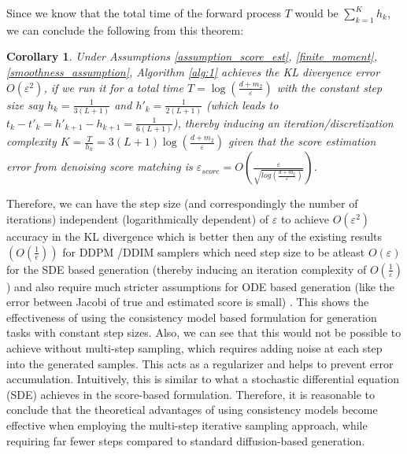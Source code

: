 \documentclass[11pt]{article}
\newcommand{\xh}[1]{\textcolor[HTML]{66CCFF}{#1}}
\newtheorem{corollary}[lemma]{Corollary}
\begin{document}


\noindent
Since we know that the total time of the forward process $T$ would be $\sum^K_{k=1}h_k$, we can conclude the following from this theorem:
\begin{corollary}
 Under Assumptions \ref{assumption_score_est}, \ref{finite_moment}, \ref{smoothness_assumption},   Algorithm \ref{alg:1} achieves the KL divergence error $O(\varepsilon^2)$, if we run it for a total time $T = \log(\frac{d+m_2}{\varepsilon})$
    with the constant step size say $h_k = \frac{1}{3(L+1)}$ and $h'_k = \frac{1}{2(L+1)}$ (which leads to $t_k-t'_k = h'_{k+1}-h_{k+1} = \frac{1}{6(L+1)}$), thereby inducing an iteration/discretization complexity $K=\frac{T}{h_k} = 3(L+1)\log(\frac{d+m_2}{\varepsilon})$ given that the score estimation error from denoising score matching is $\varepsilon_{score} = O\left(\frac{\varepsilon}{\sqrt{log(\frac{d+m_2}{\varepsilon})}}\right)$. 
    
\end{corollary}

\noindent
Therefore, we can have the step size (and correspondingly the number of iterations) independent (logarithmically dependent) of $\varepsilon$ to achieve $O(\varepsilon^2)$ accuracy in the KL divergence which is better then any of the existing results $\left(O(\frac{1}{\epsilon})\right)$ for DDPM \cite{ho2020denoising}/DDIM \cite{song2020denoising} samplers which need step size to be atleast $O(\varepsilon)$ for the SDE based generation \cite{li2024d} (thereby inducing an iteration complexity of $O(\frac{1}{\varepsilon})$) and also require much stricter assumptions for ODE based generation (like the error between Jacobi of true and estimated score is small) \cite{li2024sharp,li2024unified}.
This shows the effectiveness of using the consistency model based formulation for generation tasks with constant step sizes. 
Also, we can see that this would not be possible to achieve without multi-step sampling, which requires adding noise at each step into the generated samples. This acts as a regularizer and helps to prevent error accumulation. Intuitively, this is similar to what a stochastic differential equation (SDE) achieves in the score-based formulation. Therefore, it is reasonable to conclude that the theoretical advantages of using consistency models become effective when employing the multi-step iterative sampling approach, while requiring far fewer steps compared to standard diffusion-based generation.
\end{document}
